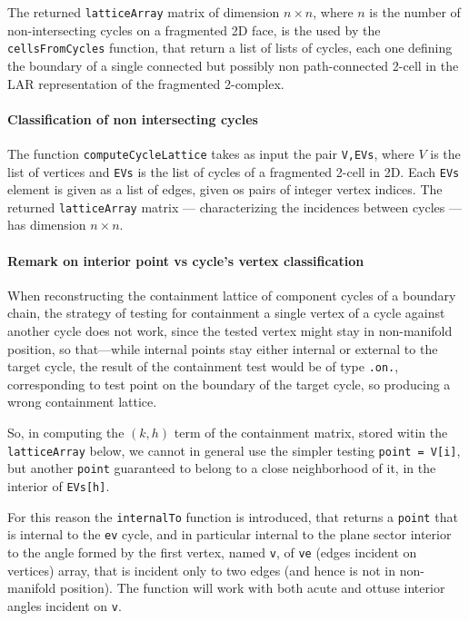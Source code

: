 \documentclass[11pt,oneside]{article}	%
\begin{document}
The returned \texttt{latticeArray} matrix of dimension $n\times n$, where $n$ is the number of non-intersecting cycles on a fragmented 2D face, is the used by the \texttt{cellsFromCycles} function, that return a list of lists of cycles, each one defining the boundary of a single connected but possibly non path-connected 2-cell in the LAR representation of the fragmented 2-complex. 

\paragraph{Classification of non intersecting cycles}

The function \texttt{computeCycleLattice} takes as input the pair \texttt{V,EVs}, where $V$ is the list of vertices and \texttt{EVs} is the list of cycles of a fragmented 2-cell in 2D. Each \texttt{EVs} element is given as a list of edges, given os pairs of integer vertex indices.
The returned \texttt{latticeArray} matrix --- characterizing the incidences between cycles --- has dimension $n\times n$.

\paragraph{Remark on interior point vs cycle's vertex classification }

When reconstructing the containment lattice of component cycles of a boundary chain, the strategy of testing for containment a single vertex of a cycle against another cycle does not work, since the tested vertex might stay in non-manifold position, so that---while internal points stay either internal or external to the target cycle, the result of the containment test would be of type \texttt{.on.}, corresponding to test point on the boundary of the target cycle, so producing a wrong containment lattice.

So, in computing the $(k,h)$ term of the containment matrix, stored witin the \texttt{latticeArray} below, we cannot in general use the simpler testing \texttt{point = V[i]}, but another \texttt{point} guaranteed to belong to a close neighborhood of it, in the interior of \texttt{EVs[h]}.

For this reason the \texttt{internalTo} function is introduced, that returns a \texttt{point} that is internal to the \texttt{ev} cycle, and in particular internal to the plane sector interior to the angle formed by the first vertex, named \texttt{v}, of \texttt{ve} (edges incident on vertices) array, that is incident only to two edges (and hence is not in non-manifold position). The function will work with both acute and ottuse interior angles incident on \texttt{v}.
\end{document}
